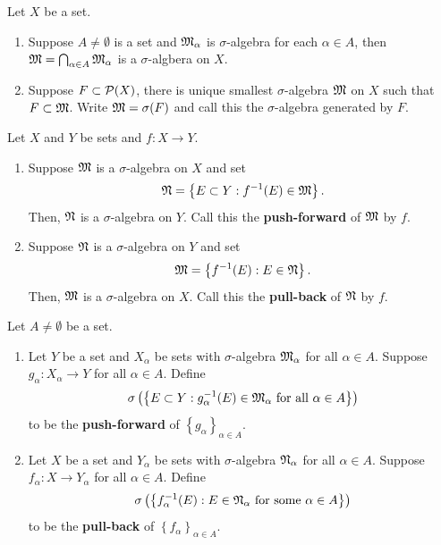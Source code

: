 \documentclass[a4paper]{article}
\begin{document}
\begin{thm}
  Let $X$ be a set.
  \begin{enumerate}
    \item Suppose $A \neq \emptyset$ is a set and 
    $\mf_\alpha$ is $\sigma$-algebra for each $
    \alpha \in A$, then $\mf = \bigcap_{\alpha \in A} 
    \mf_\alpha$ is a $\sigma$-algbera on $X$. 

    \item Suppose $F \subset \P(X)$, there is unique 
    smallest $\sigma$-algebra $\mf$ on $X$ such that 
    $F \subset \mf$. Write $\mf = \sigma(F)$ and call 
    this the $\sigma$-algebra generated by $F$.
  \end{enumerate}
\end{thm}

\begin{thm}
  Let $X$ and $Y$ be sets and $f: X \to Y$.
  \begin{enumerate}
    \item Suppose $\mf$ is a $\sigma$-algebra on $X$ 
    and set 
    \[
    \nf = \left\{ E \subset Y: 
    f^{-1}(E) \in \mf \right\}.
    \]
    Then, $\nf$ is a $\sigma$-algebra on $Y$.
    Call this the \textbf{push-forward} of $\mf$ 
    by $f$.

    \item Suppose $\nf$ is a $\sigma$-algebra 
    on $Y$ and set 
    \[
    \mf = \left\{ f^{-1}(E) : E \in \nf \right\}.
    \]
    Then, $\mf$ is a $\sigma$-algebra on $X$. Call 
    this the \textbf{pull-back} of $\nf$ by $f$.
  \end{enumerate}
\end{thm}

\begin{defi}
  Let $A \neq \emptyset$ be a set. 
  \begin{enumerate}
    \item Let $Y$ be a set and $X_\alpha$ be sets 
    with $\sigma$-algebra $\mf_\alpha$ for all 
    $\alpha \in A$. Suppose $g_\alpha : X_\alpha 
    \to Y$ for all $\alpha \in A$. Define 
    \[
    \sigma \left( \left\{ E \subset Y: g_\alpha^{-1}(E)
    \in \mf_\alpha \text{ for all $\alpha \in A$} 
    \right\} \right)
    \]
    to be the \textbf{push-forward} of $\left\{ g_\alpha 
    \right\}_{\alpha \in A}$.

    \item Let $X$ be a set and $Y_\alpha$ be sets with 
    $\sigma$-algebra $\nf_\alpha$ for all $\alpha \in A$.
    Suppose $f_\alpha : X \to Y_\alpha$ for all $\alpha \in 
    A$. Define 
    \[
    \sigma \left( \left\{ f_\alpha^{-1}(E) : 
    E \in \nf_\alpha \text{ for some $\alpha \in A$} 
    \right\} \right)
    \]
    to be the \textbf{pull-back} of $\left\{ f_\alpha
     \right\}_{\alpha \in A}$.
  \end{enumerate}
\end{defi}
\end{document}
